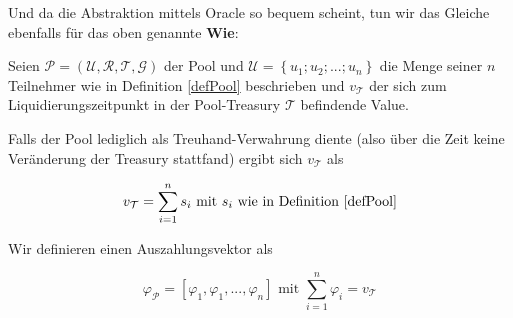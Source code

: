 Und da die Abstraktion mittels Oracle so bequem scheint, tun wir das Gleiche ebenfalls für das oben genannte \textbf{Wie}:

\vspace{0.2cm}

\begin{Fazit}

Seien $\mathcal{P} = \left( \mathcal{U}, \mathcal{R}, \mathcal{T}, \mathcal{G} \right)$ 
der Pool und $\mathcal{U} = \left\{ u_1; u_2;...;u_n \right\}$ die Menge seiner $n$ Teilnehmer wie in Definition \ref{defPool} beschrieben und $v_{\mathcal{T}}$ der sich zum Liquidierungszeitpunkt in der Pool-Treasury $\mathcal{T}$ befindende Value. 

Falls der Pool lediglich als Treuhand-Verwahrung diente (also über die Zeit keine Veränderung der Treasury stattfand) ergibt sich $v_{\mathcal{T}}$ als  

\vspace{0.1cm}

\begin{equation*}
  v_{\mathcal{T}} = \sum_{i=1}^{n} s_i \text{ mit } s_i \text{ wie in Definition \ref{defPool}}
\end{equation*}

\vspace{0.2cm}

Wir definieren einen Auszahlungsvektor als

\begin{equation*}
  \varphi_{\mathcal{P}} = [\varphi_1, \varphi_1, ..., \varphi_n] \text{ mit } \sum_{i=1}^{n} \varphi_i = v_{\mathcal{T}} 
\end{equation*}

\vspace{0.2cm}


\vspace{0.2cm}


\vspace{0.2cm}


\end{Fazit}

\vspace{0.3cm}



